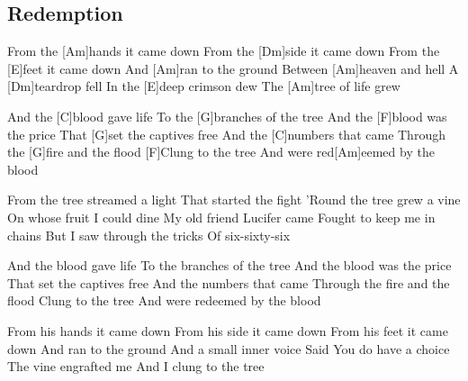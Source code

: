\subsection*{Redemption   }



\begin{guitar}

From the [Am]hands it came down
From the [Dm]side it came down
From the [E]feet it came down
And [Am]ran to the ground
Between [Am]heaven and hell
A [Dm]teardrop fell
In the [E]deep crimson dew
The [Am]tree of life grew


And the [C]blood gave life
To the [G]branches of the tree
And the [F]blood was the price
That [G]set the captives free
And the [C]numbers that came
Through the [G]fire and the flood 
[F]Clung to the tree
And were red[Am]eemed by the blood


From the tree streamed a light
That started the fight
'Round the tree grew a vine
On whose fruit I could dine
My old friend Lucifer came
Fought to keep me in chains
But I saw through the tricks
Of six-sixty-six

And the blood gave life
To the branches of the tree
And the blood was the price
That set the captives free
And the numbers that came
Through the fire and the flood 
Clung to the tree
And were redeemed by the blood

From his hands it came down
From his side it came down
From his feet it came down
And ran to the ground
And a small inner voice
Said You do have a choice
The vine engrafted me
And I clung to the tree
\end{guitar}
